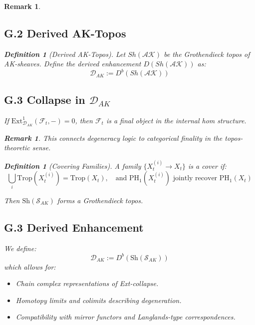 \documentclass[11pt]{article}
\newtheorem{definition}[theorem]{Definition}
\newtheorem{remark}[theorem]{Remark}
\begin{document}
\begin{remark}
\subsection*{G.2 Derived AK-Topos}

\begin{definition}[Derived AK-Topos]
Let $Sh(\mathcal{AK})$ be the Grothendieck topos of AK-sheaves.  
Define the derived enhancement $D(Sh(\mathcal{AK}))$ as:
\[
\mathcal{D}_{AK} := D^b(Sh(\mathcal{AK}))
\]
\end{definition}

\subsection*{G.3 Collapse in $\mathcal{D}_{AK}$}

\begin{proposition}
If $\mathrm{Ext}^1_{\mathcal{D}_{AK}}(\mathcal{F}_t, -) = 0$, then $\mathcal{F}_t$ is a final object in the internal hom structure.
\end{proposition}

\begin{remark}
This connects degeneracy logic to categorical finality in the topos-theoretic sense.
\end{remark}

\begin{definition}[Covering Families]
A family \( \{X_t^{(i)} \to X_t\} \) is a cover if:
\[
\bigcup_i \mathrm{Trop}(X_t^{(i)}) = \mathrm{Trop}(X_t), \quad \text{and } \mathrm{PH}_1(X_t^{(i)}) \text{ jointly recover } \mathrm{PH}_1(X_t)
\]
\end{definition}

Then \( \mathrm{Sh}(\mathcal{S}_{AK}) \) forms a Grothendieck topos.

\subsection*{G.3 Derived Enhancement}

We define:
\[
\mathcal{D}_{AK} := D^b(\mathrm{Sh}(\mathcal{S}_{AK}))
\]
which allows for:
\begin{itemize}
  \item Chain complex representations of Ext-collapse.
  \item Homotopy limits and colimits describing degeneration.
  \item Compatibility with mirror functors and Langlands-type correspondences.
\end{itemize}


\end{remark}
\end{document}
